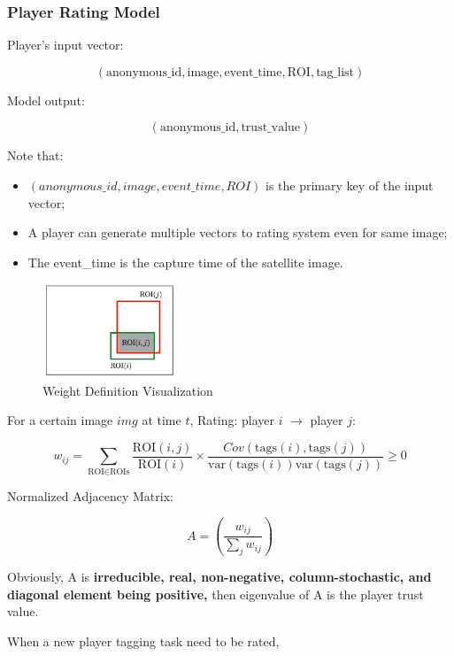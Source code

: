     \subsubsection{Player Rating Model}

    Player’s input vector: 
    
    \[
    (\text{anonymous\_id}, \text{image}, \text{event\_time}, \text{ROI}, \text{tag\_list})
    \]

    Model output: 
    
    \[
    (\text{anonymous\_id}, \text{trust\_value})
    \]

    Note that:

    \begin{itemize}
      \item $(anonymous\_id, image, event\_time, ROI)$ is the primary key of the input vector;
      \item A player can generate multiple vectors to rating system even for same image;
      \item The event\_time is the capture time of the satellite image.
    \end{itemize}

    \begin{figure}[htp]
    \centering
    \includegraphics[width=4cm]{figures/weight-define}
    \caption{Weight Definition Visualization}
    \label{fig:roiweight}
    \end{figure}

    For a certain image $img$ at time $t$, Rating: player $i$ $\rightarrow$ player $j$:

    \[
    w_{ij}=\sum_{\text{ROI}\in \text{ROIs}}\frac{\text{ROI}(i,j)}{\text{ROI}(i)} \times \frac{Cov(\text{tags}(i), \text{tags}(j))}{\text{var}(\text{tags}(i))\text{var}(\text{tags}(j))} \geq 0
    \]

    Normalized Adjacency Matrix:

    \[
    A = (\frac{w_{ij}}{\sum_{j}{w_{ij}}})
    \]

    Obviously, A is \textbf{irreducible, real, non-negative, column-stochastic, and diagonal element being positive,} then eigenvalue of A is the player trust value.

    When a new player tagging task need to be rated,


